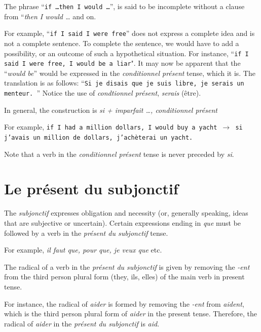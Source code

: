 \documentclass[11pt, oneside]{book}
\begin{document}
{The phrase ``\texttt{if \ldots then I would \ldots}”, is said to be incomplete without a clause from ``\textit{then I would \ldots} and on. \vspace{0.5\baselineskip}
 
For example, “\texttt{if I said I were free}” does not express a complete idea and is not a complete sentence. To complete the sentence, we would have to add a possibility, or an outcome of such a hypothetical situation. For instance, ``\texttt{if I said I were free, I would be a liar}". It may now be apparent that the “\textit{would be}” would be expressed in the \textit{conditionnel pr\'esent} tense, which it is. The translation is as follows: “\texttt{Si je disais que je suis libre, je serais un menteur.
}” Notice the use of \textit{condtionnel pr\'esent}, \textit{serais} (\^etre). \vspace{0.5\baselineskip}

In general, the construction is \textit{si + imparfait \ldots , conditionnel pr\'esent} \vspace{0.5\baselineskip}

For example, \texttt{if I had a million dollars, I would buy a yacht $\rightarrow$ si j'avais un million de dollars, j'ach\`eterai un yacht.} \vspace{0.5\baselineskip}

Note that a verb in the \textit{conditionnel pr\'esent} tense is never preceded by \textit{si}. 


\section{Le pr\'esent du subjonctif}

The \textit{subjonctif} expresses obligation and necessity (or, generally speaking, ideas that are subjective or uncertain). Certain expressions ending in \textit{que} must be followed by a verb in the \textit{pr\'esent du subjonctif} tense. \vspace{0.5\baselineskip} 

For example, \textit{il faut que, pour que, je veux que} etc.  \vspace{0.5\baselineskip}

The radical of a verb in the \textit{pr\'esent du subjonctif}  is given by removing the \textit{-ent} from the third person plural form (they, ils, elles) of the main verb in present tense.  \vspace{0.25\baselineskip}

For instance, the radical of \textit{aider} is formed by removing the \textit{-ent} from \textit{aident}, which is the third person plural form of \textit{aider} in the present tense. Therefore, the radical of \textit{aider} in the \textit{pr\'esent du subjonctif} is \textit{aid}.  \vspace{0.5\baselineskip}

}
\end{document}
